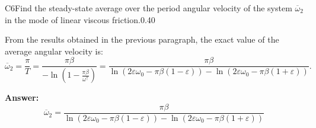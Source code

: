 \documentclass[11pt,a4paper]{article}
\begin{document}
\begin{solcard}{C6}{Find the steady-state average over the period angular velocity of the system $\overline\omega_2$ in the mode of linear viscous friction.}{0.40}

From the results obtained in the previous paragraph, the exact value of the average angular velocity is: \[\overline\omega_2=\frac{\pi}T=\frac{\pi\beta}{-\ln\left(1-\frac{\pi\beta}{\omega^\uparrow}\right)}=\frac{\pi\beta}{\ln\left(2\varepsilon\omega_0-\pi\beta(1-\varepsilon)\right)-\ln\left(2\varepsilon\omega_0-\pi\beta(1+\varepsilon)\right)}.\]

\par\smallskip\noindent\textbf{Answer:} \[\overline\omega_2=\frac{\pi\beta}{\ln\left(2\varepsilon\omega_0-\pi\beta(1-\varepsilon)\right)-\ln\left(2\varepsilon\omega_0-\pi\beta(1+\varepsilon)\right)}\]
\end{solcard}
\end{document}
